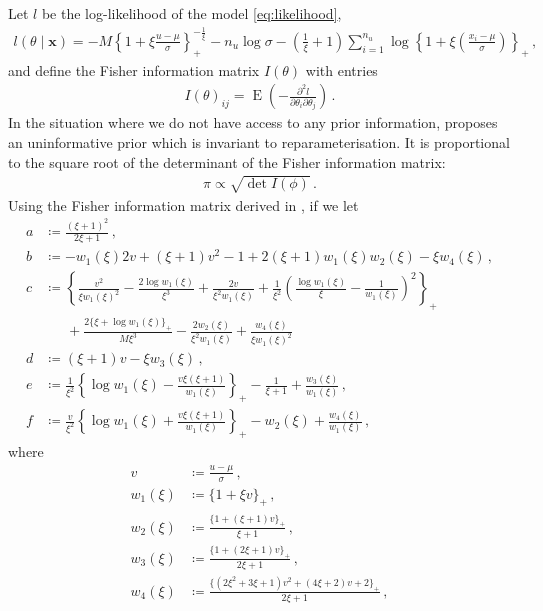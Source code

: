 \documentclass{article}
\DeclareMathOperator{\E}{E}
\begin{document}
%
Let $l$ be the log-likelihood of the model \eqref{eq:likelihood},
%
\begin{align*}
	l(\theta \mid \mathbf{x}) = 
		-M \left\{1 + \xi \frac{u - \mu}{\sigma}\right\}_+
		^ {-\frac{1}{\xi}} - n_u \log \sigma
		-\left(\frac{1}{\xi} + 1\right)\sum_{i = 1}^{n_u}
		\log\left\{1 + \xi\left(\frac{x_i - \mu}{\sigma}\right)\right\}_+ \,,
\end{align*}
%
and define the Fisher information matrix $I(\theta)$ with entries
%
\begin{align*}
	I(\theta)_{ij}
		= \E\left(-\frac{\partial^2 l}
		{\partial \theta_i \partial \theta_j}\right) \,.
\end{align*}
%
In the situation where we do not have access to any prior information,
\cite{jeffreys1946} proposes an uninformative prior
which is invariant to reparameterisation.
It is proportional to the square root of the determinant of the
Fisher information matrix:
%
\begin{align*}
	\pi \propto \sqrt{\det I(\phi)} \,.
\end{align*}
%
Using the Fisher information matrix derived in \cite{sharkey2017}, if we let
%
\begin{align*}
	a &\coloneqq \frac{(\xi + 1)^2}{2\xi + 1} \,, \\
	b &\coloneqq -w_1(\xi)2 v + (\xi + 1) v^2 - 1
		  + 2(\xi + 1) w_1(\xi) w_2(\xi) - \xi w_4(\xi) \,, \\
	c &\coloneqq \left\{\frac{v^2}{\xi w_1(\xi)^2}
		- \frac{2\log w_1(\xi)}{\xi ^ 3}
		 + \frac{2v}{\xi ^ 2 w_1(\xi)}
		 + \frac{1}{\xi ^ 2}\left(\frac{\log w_1(\xi)}{\xi} - \frac{1}{w_1(\xi)}
		\right)^2 \right\}_+ \\
	&\ \phantom{=} + \frac{2\{\xi + \log w_1(\xi)\}_+}{M\xi ^ 3}
		- \frac{2w_2(\xi)}{\xi ^ 2w_1(\xi)}
	+ \frac{w_4(\xi)}{\xi w_1(\xi)^2} \\
	d &\coloneqq (\xi + 1)v - \xi w_3(\xi) \,, \\
	e &\coloneqq \frac{1}{\xi^2}\left\{\log w_1(\xi)
		-\frac{v \xi (\xi + 1)}{w_1(\xi)} \right\}_+ - \frac{1}{\xi + 1}
		+ \frac{w_3(\xi)}{w_1(\xi)} \,, \\
	f &\coloneqq \frac{v}{\xi ^2}\left\{\log w_1(\xi)
		+ \frac{v \xi (\xi + 1)}{w_1(\xi)} \right\}_+	
		- w_2(\xi) + \frac{w_4(\xi)}{w_1(\xi)} \,,
\end{align*}
%
where
%
\begin{align*}
	v &\coloneqq \frac{u - \mu}{\sigma} \,, \\
	w_1(\xi) &\coloneqq \{1 + \xi v\}_+ \,, \\
	w_2(\xi) &\coloneqq \frac{\{1 + (\xi + 1) v\}_+}{\xi + 1} \,, \\
	w_3(\xi) &\coloneqq \frac{\{1 + (2\xi + 1) v\}_+}{2\xi + 1} \,, \\
	w_4(\xi) &\coloneqq \frac{\{(2 \xi^2 + 3\xi + 1) v^2 
		+ (4\xi + 2) v + 2\}_+}{2\xi + 1} \,,
\end{align*}
\end{document}
